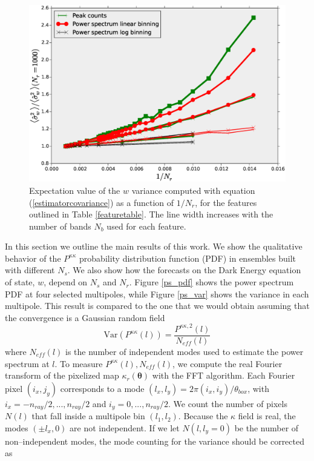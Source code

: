 \documentclass[reprint,aps,prd,superscriptaddress,showkeys,showpacs]{revtex4-1}
\begin{document}
\begin{figure}
\includegraphics[scale=0.3]{Figures/curving_nb.eps}
\caption{Expectation value of the $w$ variance computed with equation (\ref{estimatorcovariance}) as a function of $1/N_r$, for the features outlined in Table \ref{featuretable}. The line width increases with the number of bands $N_b$ used for each feature.}
\label{curvingnb}
\end{figure}


In this section we outline the main results of this work. We show the qualitative behavior of the $P^{\kappa\kappa}$ probability distribution function (PDF) in ensembles built with different $N_s$. We also show how the forecasts on the Dark Energy equation of state, $w$, depend on $N_s$ and $N_r$. Figure \ref{ps_pdf} shows the power spectrum PDF at four selected multipoles, while Figure \ref{ps_var} shows the variance in each multipole. This result is compared to the one that we would obtain assuming that the convergence is a Gaussian random field
\begin{equation}
\label{gaussianvar}
\mathrm{Var}(P^{\kappa\kappa}(l)) = \frac{P^{\kappa\kappa,2}(l)}{N_{eff}(l)}
\end{equation}
%
where $N_{eff}(l)$ is the number of independent modes used to estimate the power spectrum at $l$. To measure $P^{\kappa\kappa}(l),N_{eff}(l)$, we compute the real Fourier transform of the pixelized map $\kappa_r(\pmb{\theta})$ with the FFT algorithm. Each Fourier pixel $(i_x,j_y)$ corresponds to a mode $(l_x,l_y)=2\pi(i_x,i_y)/\theta_{box}$, with $i_x=-n_{ray}/2,...,n_{ray}/2$ and $i_y=0,...,n_{ray}/2$. We count the number of pixels $N(l)$ that fall inside a multipole bin $(l_1,l_2)$. Because the $\kappa$ field is real, the modes $(\pm l_x,0)$ are not independent. If we let $N(l,l_y=0)$ be the number of non--independent modes, the mode counting for the variance should be corrected as 
\end{document}
